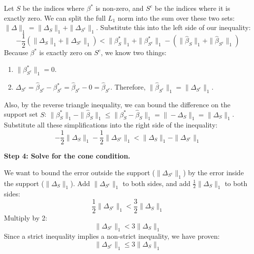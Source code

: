 \begin{solution}
Let $S$ be the indices where $\beta^*$ is non-zero, and $S^c$ be the indices where it is exactly zero.
We can split the full $L_1$ norm into the sum over these two sets: $\|\Delta\|_1 = \|\Delta_S\|_1 + \|\Delta_{S^c}\|_1$.
Substitute this into the left side of our inequality:
\[ -\frac{1}{2}(\|\Delta_S\|_1 + \|\Delta_{S^c}\|_1) < \|\beta^*_S\|_1 + \|\beta^*_{S^c}\|_1 - (\|\widehat{\beta}_S\|_1 + \|\widehat{\beta}_{S^c}\|_1) \]
Because $\beta^*$ is exactly zero on $S^c$, we know two things:
\begin{enumerate}
    \item $\|\beta^*_{S^c}\|_1 = 0$.
    \item $\Delta_{S^c} = \widehat{\beta}_{S^c} - \beta^*_{S^c} = \widehat{\beta}_{S^c} - 0 = \widehat{\beta}_{S^c}$. Therefore, $\|\widehat{\beta}_{S^c}\|_1 = \|\Delta_{S^c}\|_1$.
\end{enumerate}
Also, by the reverse triangle inequality, we can bound the difference on the support set $S$:
$\|\beta^*_S\|_1 - \|\widehat{\beta}_S\|_1 \leq \|\beta^*_S - \widehat{\beta}_S\|_1 = \|-\Delta_S\|_1 = \|\Delta_S\|_1$.
Substitute all these simplifications into the right side of the inequality:
\[ -\frac{1}{2}\|\Delta_S\|_1 - \frac{1}{2}\|\Delta_{S^c}\|_1 < \|\Delta_S\|_1 - \|\Delta_{S^c}\|_1 \]

\textbf{Step 4: Solve for the cone condition.}

We want to bound the error outside the support ($\|\Delta_{S^c}\|_1$) by the error inside the support ($\|\Delta_S\|_1$).
Add $\|\Delta_{S^c}\|_1$ to both sides, and add $\frac{1}{2}\|\Delta_S\|_1$ to both sides:
\[ \frac{1}{2}\|\Delta_{S^c}\|_1 < \frac{3}{2}\|\Delta_S\|_1 \]
Multiply by 2:
\[ \|\Delta_{S^c}\|_1 < 3\|\Delta_S\|_1 \]
Since a strict inequality implies a non-strict inequality, we have proven:
\[ \|\Delta_{S^c}\|_1 \leq 3\|\Delta_S\|_1 \]
\end{solution}

